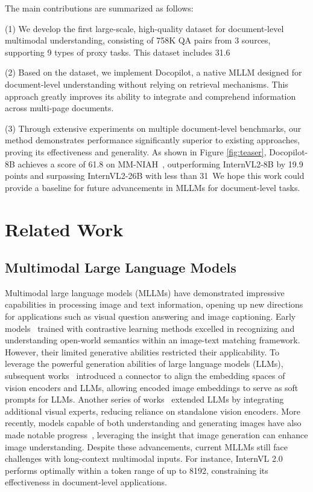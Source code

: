\documentclass[10pt,twocolumn,letterpaper]{article}
\def\modelname{Docopilot\xspace}
\begin{document}
\begin{CJK}{UTF8}{gbsn}
The main contributions are summarized as follows:

(1) We develop the first large-scale, high-quality dataset for document-level multimodal understanding, consisting of 758K QA pairs from 3 sources, supporting 9 types of proxy tasks. This dataset includes 31.6\

(2) Based on the dataset, we implement Docopilot, a native MLLM designed for document-level understanding without relying on retrieval mechanisms. 
This approach greatly improves its ability to integrate and comprehend information across multi-page documents.

(3) Through extensive experiments on multiple document-level benchmarks, our method demonstrates performance significantly superior to existing approaches, proving its effectiveness and generality. 
As shown in Figure \ref{fig:teaser}, \modelname-8B achieves a score of 61.8 on MM-NIAH~\cite{wang2024mmniah}, outperforming InternVL2-8B by 19.9 points and surpassing InternVL2-26B with less than 31\
We hope this work could provide a baseline for future advancements in MLLMs for document-level tasks.


\section{Related Work}

\subsection{Multimodal Large Language Models}

Multimodal large language models (MLLMs) have demonstrated impressive capabilities in processing image and text information, opening up new directions for applications such as visual question answering and image captioning.
Early models~\cite{openclip, rebuffi2017learning, li2022blip, chen2023internvl} trained with contrastive learning methods excelled in recognizing and understanding open-world semantics within an image-text matching framework. However, their limited generative abilities restricted their applicability.
To leverage the powerful generation abilities of large language models (LLMs), subsequent works~\cite{li2023blip2, liu2023llava, chen2024far, wang2023allseeing, wang2024allseeingv2,2023interngpt} introduced a connector to align the embedding spaces of vision encoders and LLMs, allowing encoded image embeddings to serve as soft prompts for LLMs. 
Another series of works~\cite{alayrac2022flamingo,li2024omnicorpus,laurenccon2024obelics,zhu2024mmc4} extended LLMs by integrating additional visual experts, reducing reliance on standalone vision encoders.
More recently, models capable of both understanding and generating images have also made notable progress~\cite{tian2024mminterleaved, dong2023dreamllm, sun2023emu, li2023seed}, leveraging the insight that image generation can enhance image understanding.
Despite these advancements, current MLLMs still face challenges with long-context multimodal inputs. For instance, InternVL 2.0~\cite{chen2024far,gao2024mini_internvl} performs optimally within a token range of up to 8192, constraining its effectiveness in document-level applications.



\end{CJK}
\end{document}
